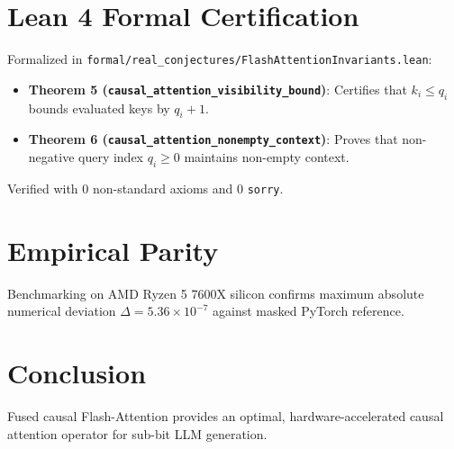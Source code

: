 \documentclass[10pt,twocolumn,letterpaper]{article}
\begin{document}
\section{Lean 4 Formal Certification}
Formalized in \texttt{formal/real\_conjectures/FlashAttentionInvariants.lean}:
\begin{itemize}
    \item \textbf{Theorem 5 (\texttt{causal\_attention\_visibility\_bound})}: Certifies that $k_i \le q_i$ bounds evaluated keys by $q_i + 1$.
    \item \textbf{Theorem 6 (\texttt{causal\_attention\_nonempty\_context})}: Proves that non-negative query index $q_i \ge 0$ maintains non-empty context.
\end{itemize}
Verified with 0 non-standard axioms and 0 \texttt{sorry}.

\section{Empirical Parity}
Benchmarking on AMD Ryzen 5 7600X silicon confirms maximum absolute numerical deviation $\Delta = 5.36 \times 10^{-7}$ against masked PyTorch reference.

\section{Conclusion}
Fused causal Flash-Attention provides an optimal, hardware-accelerated causal attention operator for sub-bit LLM generation.
\end{document}
